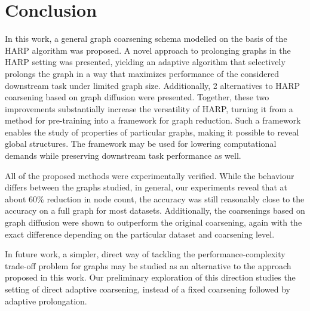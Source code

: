 \section{Conclusion}

In this work, a general graph coarsening schema modelled on the basis of the HARP algorithm was proposed. A novel approach to prolonging graphs in the HARP setting was presented, yielding an adaptive algorithm that selectively prolongs the graph in a way that maximizes performance of the considered downstream task under limited graph size. Additionally, 2 alternatives to HARP coarsening based on graph diffusion were presented. Together, these two improvements substantially increase the versatility of HARP, turning it from a method for pre-training into a framework for graph reduction. Such a framework enables the study of properties of particular graphs, making it possible to reveal global structures. The framework may be used for lowering computational demands while preserving downstream task performance as well.

All of the proposed methods were experimentally verified. While the behaviour differs between the graphs studied, in general, our experiments reveal that at about 60\% reduction in node count, the accuracy was still reasonably close to the accuracy on a full graph for most datasets. Additionally, the coarsenings based on graph diffusion were shown to outperform the original coarsening, again with the exact difference depending on the particular dataset and coarsening level.

In future work, a simpler, direct way of tackling the performance-complexity trade-off problem for graphs may be studied as an alternative to the approach proposed in this work. Our preliminary exploration of this direction studies the setting of direct adaptive coarsening, instead of a fixed coarsening followed by adaptive prolongation.
